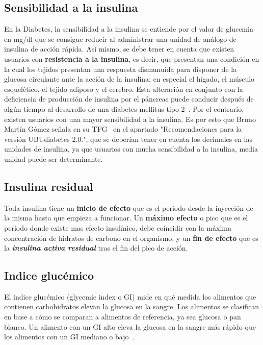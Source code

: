 \subsection{Sensibilidad a la insulina}
En la Diabetes, la sensibilidad a la insulina se entiende por el valor de glucemia en mg/dl que se consigue reducir al administrar una unidad de análogo de insulina de acción rápida.
Así mismo, se debe tener en cuenta que existen usuarios con \textbf{resistencia a la insulina}, es decir, que presentan una condición en la cual los tejidos presentan una respuesta dismunuida para disponer de la glucosa circulante ante la acción de la insulina; en especial el hígado, el músculo esquelético, el tejido adiposo y el cerebro. Esta alteración en conjunto con la deficiencia de producción de insulina por el páncreas puede conducir después de algún tiempo al desarrollo de una diabetes mellitus tipo 2~\cite{resistenciaIns}.
Por el contrario, existen usuarios con una mayor sensibilidad a la insulina. Es por esto que Bruno Martín Gómez señala en su TFG~\cite{bruno2017} en el apartado "Recomendaciones para la versión UBUdiabetes 2.0.", que se deberían tener en cuenta los decimales en las unidades de insulina, ya que usuarios con mucha sensibilidad a la insulina, media unidad puede ser determinante.

\subsection{Insulina residual}
Toda insulina tiene un \textbf{inicio de efecto} que es el periodo desde la inyección de la misma hasta que empieza a funcionar. Un \textbf{máximo efecto} o pico que es el periodo donde existe mas efecto insulínico, debe coincidir con la máxima concentración de hidratos de carbono en el organismo, y un \textbf{fin de efecto} que es la \textbf{\textit{insulina activa residual}} tras el fin del pico de acción.
\subsection{Indice glucémico}
El índice glucémico (glycemic index o GI) mide en qué medida los alimentos que contienen carbohidratos elevan la glucosa en la sangre.
Los alimentos se clasifican en base a cómo se comparan a alimentos de referencia, ya sea glucosa o pan blanco. Un alimento con un GI alto eleva la glucosa en la sangre más rápido que los alimentos con un GI mediano o bajo~\cite{indicegluce}.
